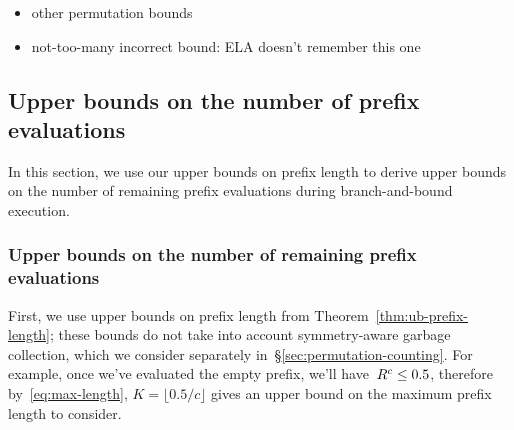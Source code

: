 
\begin{itemize}
\item other permutation bounds
\item not-too-many incorrect bound:  ELA doesn't remember this one
\end{itemize}






\subsection{Upper bounds on the number of prefix evaluations}

In this section, we use our upper bounds on prefix length to derive upper bounds on
the number of remaining prefix evaluations during branch-and-bound execution.

\subsubsection{Upper bounds on the number of remaining prefix evaluations}
\label{sec:ub-size}

First, we use upper bounds on prefix length from Theorem~\ref{thm:ub-prefix-length};
these bounds do not take into account symmetry-aware garbage collection,
which we consider separately in~\S\ref{sec:permutation-counting}.
%
For example, once we've evaluated the empty prefix, we'll have~${R^c \le 0.5}$,
therefore by~\eqref{eq:max-length}, ${K = \lfloor 0.5 / c \rfloor}$ gives
an upper bound on the maximum prefix length to consider.

